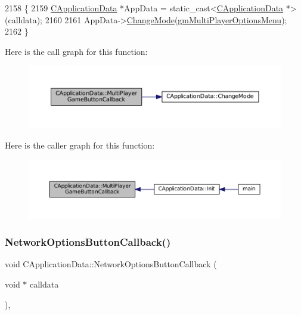 \begin{DoxyCode}
2158                                                                   \{
2159     \hyperlink{classCApplicationData}{CApplicationData} *AppData = \textcolor{keyword}{static\_cast<}\hyperlink{classCApplicationData}{CApplicationData} *\textcolor{keyword}{>}(calldata);
2160     
2161     AppData->\hyperlink{classCApplicationData_aee18c113e9a0acb3cad3d63eb19de71b}{ChangeMode}(\hyperlink{classCApplicationData_ac8ac37a4c8bb871036fbbdc6a072e403a05987f29b3dd70c7223dd209c0f4ef8e}{gmMultiPlayerOptionsMenu});
2162 \}
\end{DoxyCode}
Here is the call graph for this function\+:
\nopagebreak
\begin{figure}[H]
\begin{center}
\leavevmode
\includegraphics[width=350pt]{classCApplicationData_afabb120415cdadf67edca20c67e8c6fa_cgraph}
\end{center}
\end{figure}
Here is the caller graph for this function\+:
\nopagebreak
\begin{figure}[H]
\begin{center}
\leavevmode
\includegraphics[width=350pt]{classCApplicationData_afabb120415cdadf67edca20c67e8c6fa_icgraph}
\end{center}
\end{figure}
\hypertarget{classCApplicationData_ad41dbc2f54ee638aa64a1d0c22b3fba9}{}\label{classCApplicationData_ad41dbc2f54ee638aa64a1d0c22b3fba9} 
\subsubsection{\texorpdfstring{Network\+Options\+Button\+Callback()}{NetworkOptionsButtonCallback()}}
{\footnotesize\ttfamily void C\+Application\+Data\+::\+Network\+Options\+Button\+Callback (\begin{DoxyParamCaption}\item[{void $\ast$}]{calldata }\end{DoxyParamCaption})\hspace{0.3cm}{\ttfamily [static]}, {\ttfamily [protected]}}



